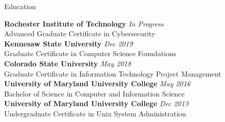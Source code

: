 \documentclass{resume} %
\begin{document}
\begin{rSection}{Education}

{\bf Rochester Institute of Technology} \hfill {\em In Progress} \\ 
Advanced Graduate Certificate in Cybersecurity \\

{\bf Kennesaw State University} \hfill {\em Dec 2019} \\ 
Graduate Certificate in Computer Science Foundations \\

{\bf Colorado State University} \hfill {\em May 2018} \\ 
Graduate Certificate in Information Technology Project Management \\

{\bf University of Maryland University College} \hfill {\em May 2016} \\ 
Bachelor of Science in Computer and Information Science \\

{\bf University of Maryland University College} \hfill {\em Dec 2013} \\ 
Undergraduate Certificate in Unix System Administration \\

\end{rSection}






\end{document}
